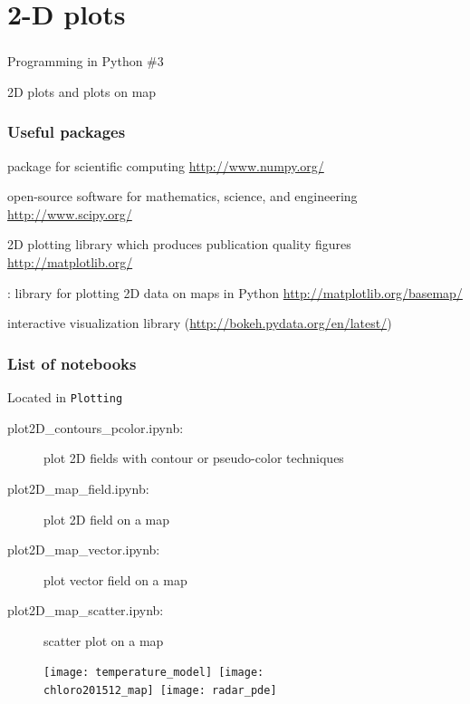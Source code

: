 \section{2-D plots}

{
\begin{frame}
\frametitle{}
{\fontsize{40}{50}\selectfont Programming in Python \#3} 

{\huge 2D plots and plots on map} 

\end{frame}
}

\begin{frame}
\frametitle{Useful packages}

\begin{description}
\item<1->[NumPy:] package for scientific computing \url{http://www.numpy.org/}
\item<1->[SciPy:] open-source software for mathematics, science, and engineering \url{http://www.scipy.org/}
\item<2->[matplotlib:] 2D plotting library which produces publication quality figures \url{http://matplotlib.org/}
\item<3->[Basemap toolkit]: library for plotting 2D data on maps in Python \url{http://matplotlib.org/basemap/}
\item[]
\item<4->[Bokeh:] interactive visualization library (\url{http://bokeh.pydata.org/en/latest/}) 
\end{description}
\end{frame}


\begin{frame}[c, fragile]
\frametitle{List of notebooks}

Located in \verb|Plotting|

{
\scriptsize
\begin{description}
\item[plot2D\_contours\_pcolor.ipynb:] plot 2D fields with contour or pseudo-color techniques       
\item[]
\item[plot2D\_map\_field.ipynb:] plot 2D field on a map              
\item[plot2D\_map\_vector.ipynb:] plot vector field on a map
\item[plot2D\_map\_scatter.ipynb:] scatter plot on a map
\end{description}
}

\begin{figure}
\texttt{[image: temperature\_model]}~\texttt{[image: chloro201512\_map]}~\texttt{[image: radar\_pde]}
\end{figure}
\end{frame}

